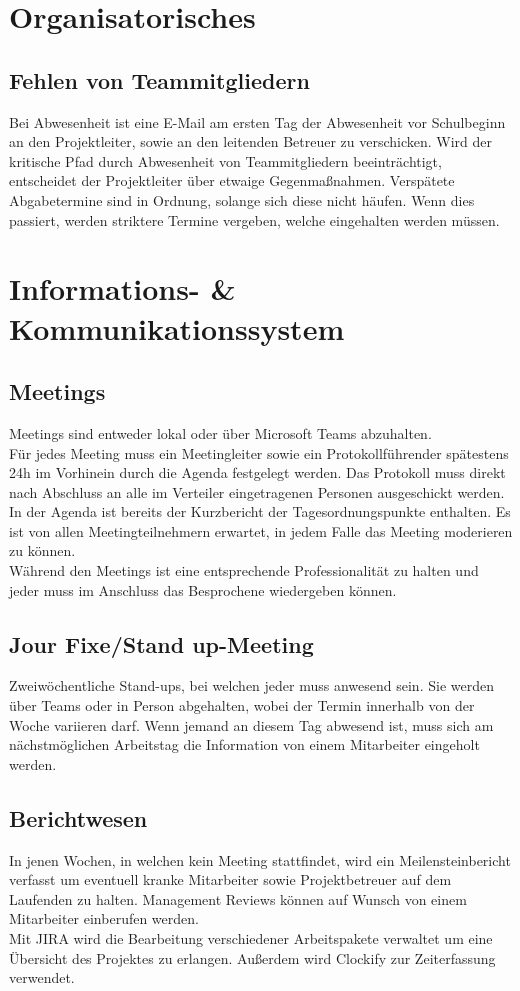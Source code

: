 \documentclass[
	headings=optiontotocandhead,%
	oneside,
	numbers=noenddot,%
	toc=flat, %
	10pt, %
	parskip=full, %
	listof=totoc, %
	listof=flat, %
	numbers=noenddot, %
	bibliography=totoc, %
	a4paper,DIV=14,
]{scrartcl}
\begin{document}
\section{Organisatorisches}
\subsection{Fehlen von Teammitgliedern}
Bei Abwesenheit ist eine E-Mail am ersten Tag der Abwesenheit vor Schulbeginn an den Projektleiter, sowie an den leitenden Betreuer zu verschicken. Wird der kritische Pfad durch Abwesenheit von Teammitgliedern beeinträchtigt, entscheidet der Projektleiter über etwaige Gegenmaßnahmen. Verspätete Abgabetermine sind in Ordnung, solange sich diese nicht häufen. Wenn dies passiert, werden striktere Termine vergeben, welche eingehalten werden müssen.

\section{Informations- \& Kommunikationssystem}
\subsection{Meetings}
Meetings sind entweder lokal oder über Microsoft Teams abzuhalten.\\
Für jedes Meeting muss ein Meetingleiter sowie ein Protokollführender spätestens 24h im Vorhinein durch die Agenda festgelegt werden. Das Protokoll muss direkt nach Abschluss an alle im Verteiler eingetragenen Personen ausgeschickt werden.\\
In der Agenda ist bereits der Kurzbericht der Tagesordnungspunkte enthalten. Es ist von allen Meetingteilnehmern erwartet, in jedem Falle das Meeting moderieren zu können.\\
Während den Meetings ist eine entsprechende Professionalität zu halten und jeder muss im Anschluss das Besprochene wiedergeben können.

\subsection{Jour Fixe/Stand up-Meeting}
Zweiwöchentliche Stand-ups, bei welchen jeder muss anwesend sein. Sie werden über Teams oder in Person abgehalten, wobei der Termin innerhalb von der Woche variieren darf. Wenn jemand an diesem Tag abwesend ist, muss sich am nächstmöglichen Arbeitstag die Information von einem Mitarbeiter eingeholt werden.

\subsection{Berichtwesen}
In jenen Wochen, in welchen kein Meeting stattfindet, wird ein Meilensteinbericht verfasst um eventuell kranke Mitarbeiter sowie Projektbetreuer auf dem Laufenden zu halten. Management Reviews können auf Wunsch von einem Mitarbeiter einberufen werden. \\
Mit JIRA wird die Bearbeitung verschiedener Arbeitspakete verwaltet um eine Übersicht des Projektes zu erlangen. Außerdem wird Clockify zur Zeiterfassung verwendet.
\end{document}
